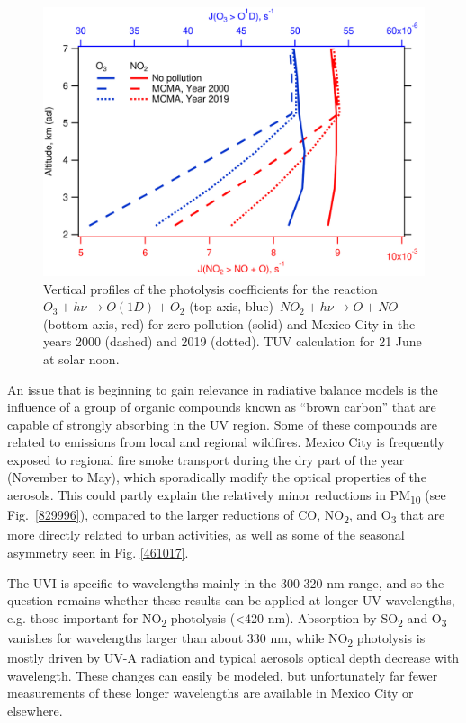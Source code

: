 \documentclass[journal=jacsat,manuscript=article]{achemso}
\begin{document}
\begin{figure}[H]
  \begin{center}
    \includegraphics[width=0.70\columnwidth]{figures/jvals}
    \caption{{Vertical profiles of the photolysis coefficients for the
          reaction~\(O_3 + h\nu \rightarrow O(1D) + O_2\) (top axis, blue)~\(NO_2 + h\nu \rightarrow O+NO \) (bottom
          axis, red) for zero pollution (solid) and Mexico City in the years 2000
          (dashed) and 2019 (dotted). TUV calculation for 21 June at solar noon.
            {\label{973680}}%
        }}
  \end{center}
\end{figure}

An issue that is beginning to gain relevance in radiative balance models
is the influence of a group of organic compounds known as “brown carbon” that are
capable of strongly absorbing in the UV region.\citep{Laskin_2015} Some of
these compounds are related to emissions from local and regional
wildfires.\citep{Gadhavi_2010} Mexico City is frequently exposed to
regional fire smoke transport during the dry part of the year (November
to May)\citep{Rios_2019}, which sporadically modify the optical
properties of the aerosols.\citep{Barnard_2008} This could partly explain
the relatively minor reductions in PM\textsubscript{10} (see
Fig.~{\ref{829996}}), compared to the larger reductions
of CO, NO\textsubscript{2}, and O\textsubscript{3} that are more
directly related to urban activities, as well as some of the seasonal
asymmetry seen in Fig. {\ref{461017}}. ~

The UVI is specific to wavelengths mainly in the 300-320 nm range, and
so the question remains whether these results can be applied at longer
UV wavelengths, e.g. those important for NO\textsubscript{2} photolysis
(\textless{}420 nm). Absorption by SO\textsubscript{2} and
O\textsubscript{3} vanishes for wavelengths larger than about 330 nm,
while NO\textsubscript{2} photolysis is mostly driven by UV-A radiation
and typical aerosols optical depth decrease with wavelength. These changes can
easily be modeled, but unfortunately far fewer measurements of these
longer wavelengths are available in Mexico City or elsewhere.
\end{document}
